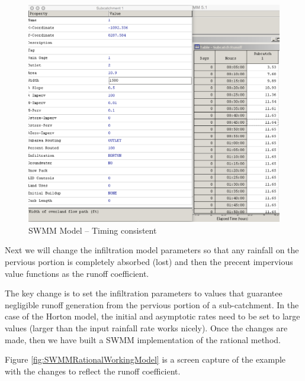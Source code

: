 \documentclass[12pt]{article}
\begin{document}
\begin{figure}[h!] %
   \centering
   \includegraphics[width=6in]{SWMMCalibratedTiming.jpg} 
   \caption{SWMM Model -- Timing consistent}
   \label{fig:SWMMCalibratedTiming}
\end{figure}

Next we will change the infiltration model parameters so that any rainfall on the pervious portion is completely absorbed (lost) and then the precent impervious value functions as the runoff coefficient.

The key change is to set the infiltration parameters to values that guarantee negligible runoff generation from the pervious portion of a sub-catchment.  
In the case of the Horton model, the initial and asymptotic rates need to be set to large values (larger than the input rainfall rate works nicely).  
Once the changes are made, then we have built a SWMM implementation of the rational method.  

Figure \ref{fig:SWMMRationalWorkingModel} is a screen capture of the example with the changes to reflect the runoff coefficient.  
\end{document}
